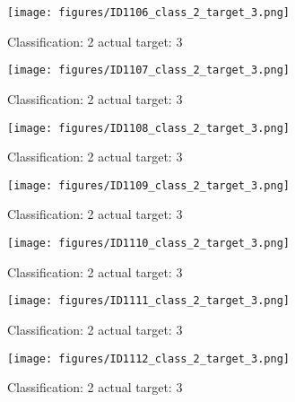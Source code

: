 \begin{figure}[h!]
\begin{center}
\texttt{[image: figures/ID1106\_class\_2\_target\_3.png]}
\end{center}
\caption{ Classification: 2 actual target: 3}
\label{fig:ID1106_class_2_target_3}
\end{figure}
\begin{figure}[h!]
\begin{center}
\texttt{[image: figures/ID1107\_class\_2\_target\_3.png]}
\end{center}
\caption{ Classification: 2 actual target: 3}
\label{fig:ID1107_class_2_target_3}
\end{figure}
\begin{figure}[h!]
\begin{center}
\texttt{[image: figures/ID1108\_class\_2\_target\_3.png]}
\end{center}
\caption{ Classification: 2 actual target: 3}
\label{fig:ID1108_class_2_target_3}
\end{figure}
\begin{figure}[h!]
\begin{center}
\texttt{[image: figures/ID1109\_class\_2\_target\_3.png]}
\end{center}
\caption{ Classification: 2 actual target: 3}
\label{fig:ID1109_class_2_target_3}
\end{figure}
\begin{figure}[h!]
\begin{center}
\texttt{[image: figures/ID1110\_class\_2\_target\_3.png]}
\end{center}
\caption{ Classification: 2 actual target: 3}
\label{fig:ID1110_class_2_target_3}
\end{figure}
\begin{figure}[h!]
\begin{center}
\texttt{[image: figures/ID1111\_class\_2\_target\_3.png]}
\end{center}
\caption{ Classification: 2 actual target: 3}
\label{fig:ID1111_class_2_target_3}
\end{figure}
\begin{figure}[h!]
\begin{center}
\texttt{[image: figures/ID1112\_class\_2\_target\_3.png]}
\end{center}
\caption{ Classification: 2 actual target: 3}
\label{fig:ID1112_class_2_target_3}
\end{figure}
